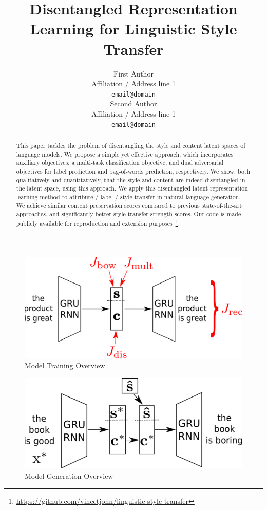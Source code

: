 \documentclass[11pt,a4paper]{article}
\title{Disentangled Representation Learning for Linguistic Style Transfer}
\author{First Author \\
  Affiliation / Address line 1 \\
  {\tt email@domain} \\\And
  Second Author \\
  Affiliation / Address line 1 \\
  {\tt email@domain} \\}
\date{}
\begin{document}
\maketitle

\graphicspath{{images/}}


\begin{abstract}
	This paper tackles the problem of disentangling the style and content latent spaces of language models. We propose a simple yet effective approach, which incorporates auxiliary objectives: a multi-task classification objective, and dual adversarial objectives for label prediction and bag-of-words prediction, respectively. We show, both qualitatively and quantitatively, that the style and content are indeed disentangled in the latent space, using this approach. We apply this disentangled latent representation learning method to attribute / label / style transfer in natural language generation. We achieve similar content preservation scores compared to previous state-of-the-art approaches, and significantly better style-transfer strength scores. Our code is made publicly available for reproduction and extension purposes~\footnote{\url{https://github.com/vineetjohn/linguistic-style-transfer}}.
\end{abstract}

% 

\begin{figure}[ht]
	\centering
	\includegraphics[width=0.8\linewidth]{model-overview-training}
	\caption{Model Training Overview}
	\label{fig:model-training-overview}
\end{figure}
\begin{figure}[ht]
	\centering
	\includegraphics[width=0.8\linewidth]{model-overview-inference}
	\caption{Model Generation Overview}
	\label{fig:model-inference-overview}
\end{figure}
\end{document}
